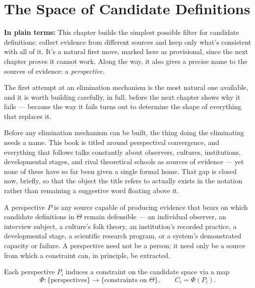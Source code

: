 \chapter{The Space of Candidate Definitions}
\label{ch:candidate-space}

\begin{plainlanguage}
\textbf{In plain terms:} This chapter builds the simplest possible filter for candidate definitions: collect evidence from different sources and keep only what's consistent with all of it. It's a natural first move, marked here as provisional, since the next chapter proves it cannot work. Along the way, it also gives a precise name to the sources of evidence: a \emph{perspective}.
\end{plainlanguage}

The first attempt at an elimination mechanism is the most natural one available, and it is worth building carefully, in full, before the next chapter shows why it fails --- because the way it fails turns out to determine the shape of everything that replaces it.

Before any elimination mechanism can be built, the thing doing the eliminating needs a name. This book is titled around perspectival convergence, and everything that follows talks constantly about observers, cultures, institutions, developmental stages, and rival theoretical schools as sources of evidence --- yet none of these have so far been given a single formal home. That gap is closed now, briefly, so that the object the title refers to actually exists in the notation rather than remaining a suggestive word floating above it.

\begin{definition}[Perspective]
A perspective $P$ is any source capable of producing evidence that bears on which candidate definitions in $\Theta$ remain defensible --- an individual observer, an interview subject, a culture's folk theory, an institution's recorded practice, a developmental stage, a scientific research program, or a system's demonstrated capacity or failure. A perspective need not be a person; it need only be a source from which a constraint can, in principle, be extracted.
\end{definition}

\begin{definition}
Each perspective $P_i$ induces a constraint on the candidate space via a map
\[
\Phi : \{\text{perspectives}\} \to \{\text{constraints on } \Theta\}, \qquad C_i = \Phi(P_i).
\]
\end{definition}

